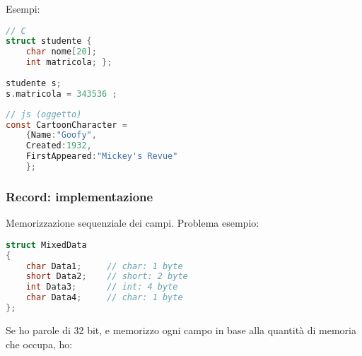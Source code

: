 \documentclass[a4paper,10pt]{article}
\begin{document}
Esempi:
\begin{multicols}{2}
 
\begin{lstlisting}[language = c]
// C
struct studente {
    char nome[20];
    int matricola; };
    
studente s;
s.matricola = 343536 ;
\end{lstlisting}

\begin{lstlisting}[language = c]
// js (oggetto)
const CartoonCharacter =
    {Name:"Goofy",
    Created:1932,
    FirstAppeared:"Mickey's Revue"
    };
\end{lstlisting}

\end{multicols}
\subsubsection{Record: implementazione}
Memorizzazione sequenziale dei campi. Problema esempio:
\begin{multicols}{2}
 
\begin{lstlisting}[language=c]
 struct MixedData
{
    char Data1;     // char: 1 byte
    short Data2;    // short: 2 byte
    int Data3;      // int: 4 byte
    char Data4;     // char: 1 byte
};
\end{lstlisting}

Se ho parole di 32 bit, e memorizzo ogni campo in base alla quantità di memoria che occupa, ho:
\begin{center}
 

\end{center}


\end{multicols}

\smallskip
\end{document}
